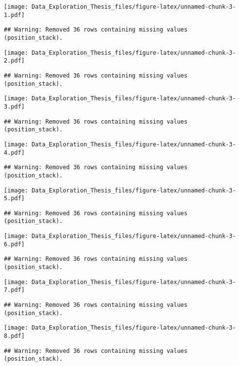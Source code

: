 \documentclass[]{article}
\begin{document}
\texttt{[image: Data\_Exploration\_Thesis\_files/figure-latex/unnamed-chunk-3-1.pdf]}

\begin{verbatim}
## Warning: Removed 36 rows containing missing values (position_stack).
\end{verbatim}

\texttt{[image: Data\_Exploration\_Thesis\_files/figure-latex/unnamed-chunk-3-2.pdf]}

\begin{verbatim}
## Warning: Removed 36 rows containing missing values (position_stack).
\end{verbatim}

\texttt{[image: Data\_Exploration\_Thesis\_files/figure-latex/unnamed-chunk-3-3.pdf]}

\begin{verbatim}
## Warning: Removed 36 rows containing missing values (position_stack).
\end{verbatim}

\texttt{[image: Data\_Exploration\_Thesis\_files/figure-latex/unnamed-chunk-3-4.pdf]}

\begin{verbatim}
## Warning: Removed 36 rows containing missing values (position_stack).
\end{verbatim}

\texttt{[image: Data\_Exploration\_Thesis\_files/figure-latex/unnamed-chunk-3-5.pdf]}

\begin{verbatim}
## Warning: Removed 36 rows containing missing values (position_stack).
\end{verbatim}

\texttt{[image: Data\_Exploration\_Thesis\_files/figure-latex/unnamed-chunk-3-6.pdf]}

\begin{verbatim}
## Warning: Removed 36 rows containing missing values (position_stack).
\end{verbatim}

\texttt{[image: Data\_Exploration\_Thesis\_files/figure-latex/unnamed-chunk-3-7.pdf]}

\begin{verbatim}
## Warning: Removed 36 rows containing missing values (position_stack).
\end{verbatim}

\texttt{[image: Data\_Exploration\_Thesis\_files/figure-latex/unnamed-chunk-3-8.pdf]}

\begin{verbatim}
## Warning: Removed 36 rows containing missing values (position_stack).
\end{verbatim}
\end{document}
